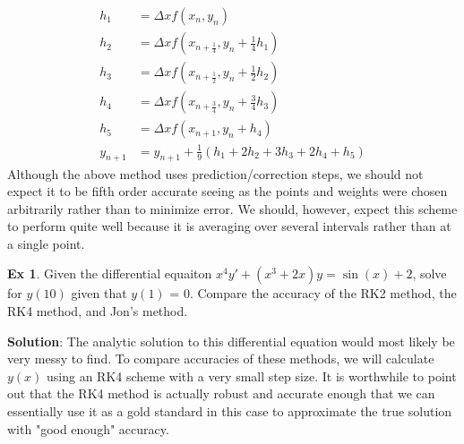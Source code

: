\documentclass[]{article}
\theoremstyle{definition}
\newtheorem{exmp}{Ex}[section]
\numberwithin{equation}{section}
\begin{document}
		\begin{align*}
			h_1 &= \Delta x f(x_n,y_n) \\
			h_2 &= \Delta x f(x_{n+\frac{1}{4}}, y_n + \frac{1}{4}h_1) \\
			h_3 &= \Delta x f(x_{n+\frac{1}{2}}, y_n + \frac{1}{2} h_2) \\
			h_4 &= \Delta x f(x_{n+\frac{3}{4}}, y_n + \frac{3}{4} h_3) \\
			h_5 &= \Delta x f(x_{n+1}, y_n + h_4) \\
			y_{n+1} &= y_{n+1} + \frac{1}{9} (h_1 + 2h_2 + 3h_3 + 2h_4 + h_5)
		\end{align*}
		Although the above method uses  prediction/correction steps, we should not expect it to be fifth order accurate seeing as the points and weights were chosen arbitrarily rather than to minimize error. We should, however, expect this scheme to perform quite well because it is averaging over several intervals rather than at a single point.
		
		\begin{exmp}
			Given the differential equaiton $x^4y'+ (x^3 + 2x)y = \sin(x) + 2$, solve for $y(10)$ given that $y(1)$ = 0. Compare the accuracy of the RK2 method, the RK4 method, and Jon's method. 
		\end{exmp}
	\textbf{Solution}: The analytic solution to this differential equation would most likely be very messy to find. To compare accuracies of these methods, we will calculate $y(x)$ using an RK4 scheme with a very small step size. It is worthwhile to point out that the RK4 method is actually robust and accurate enough that we can essentially use it as a gold standard in this case to approximate the true solution with "good enough" accuracy.
	
\end{document}

